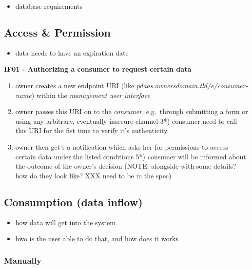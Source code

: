 \documentclass[12pt,english,a4paper,titlepage,cleardoublepage=empty,dottedtoc]{report}
\providecommand{\tightlist}{%
  \setlength{\itemsep}{0pt}\setlength{\parskip}{0pt}}
\begin{document}
\begin{itemize}
\tightlist
\item
  database requirements
\end{itemize}

\subsection{Access \& Permission}\label{access-permission}

\begin{itemize}
\tightlist
\item
  data needs to have an expiration date
\end{itemize}

\textbf{IF01 - Authorizing a consumer to request certain data}

\begin{enumerate}
\def\labelenumi{\arabic{enumi})}
\tightlist
\item
  owner creates a new endpoint URI (like
  \emph{pdaas.ownersdomain.tld/e/consumer-name}) within the
  \emph{management user interface}
\item
  owner passes this URI on to the \emph{consumer}, e.g.~through
  submitting a form or using any arbitrary, eventually insecure channel
  3*) consumer need to call this URI for the fist time to verify it's
  authenticity
\item
  owner then get's a notification which asks her for permissions to
  access certain data under the listed conditions 5*) consumer will be
  informed about the outcome of the owner's decision (NOTE: alongside
  with some details? how do they look like? XXX need to be in the spec)
\end{enumerate}

\subsection{Consumption (data inflow)}\label{consumption-data-inflow}

\begin{itemize}
\tightlist
\item
  how data will get into the system
\item
  hwo is the user able to do that, and how does it works
\end{itemize}

\subsubsection{Manually}\label{manually}
\end{document}

